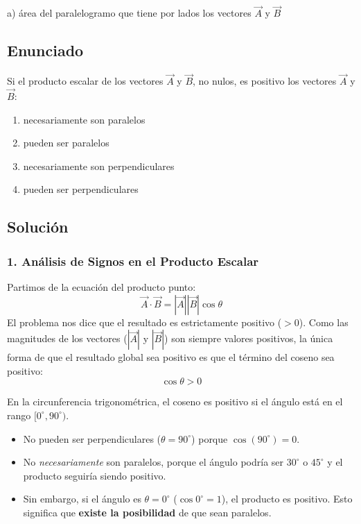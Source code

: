 \documentclass[12pt, a4paper]{article}
\begin{document}
\begin{tcolorbox}[colback=green!5!white, colframe=green!50!black, title=Respuesta Final]
\centering \Large a) área del paralelogramo que tiene por lados los vectores $\vec{A}$ y $\vec{B}$
\end{tcolorbox}

\newpage


\subsection*{Enunciado}
Si el producto escalar de los vectores $\vec{A}$ y $\vec{B}$, no nulos, es positivo los vectores $\vec{A}$ y $\vec{B}$:
\begin{enumerate}[label=\alph*)]
    \item necesariamente son paralelos
    \item pueden ser paralelos
    \item necesariamente son perpendiculares
    \item pueden ser perpendiculares
\end{enumerate}

\subsection*{Solución}

\subsubsection*{1. Análisis de Signos en el Producto Escalar}
Partimos de la ecuación del producto punto:
$$ \vec{A} \cdot \vec{B} = |\vec{A}| |\vec{B}| \cos\theta $$
El problema nos dice que el resultado es estrictamente positivo ($> 0$). Como las magnitudes de los vectores ($|\vec{A}|$ y $|\vec{B}|$) son siempre valores positivos, la única forma de que el resultado global sea positivo es que el término del coseno sea positivo:
$$ \cos\theta > 0 $$

En la circunferencia trigonométrica, el coseno es positivo si el ángulo está en el rango $[0^\circ, 90^\circ)$.
\begin{itemize}
    \item No pueden ser perpendiculares ($\theta = 90^\circ$) porque $\cos(90^\circ) = 0$.
    \item No \textit{necesariamente} son paralelos, porque el ángulo podría ser $30^\circ$ o $45^\circ$ y el producto seguiría siendo positivo.
    \item Sin embargo, si el ángulo es $\theta = 0^\circ$ ($\cos 0^\circ = 1$), el producto es positivo. Esto significa que \textbf{existe la posibilidad} de que sean paralelos.
\end{itemize}
\end{document}
